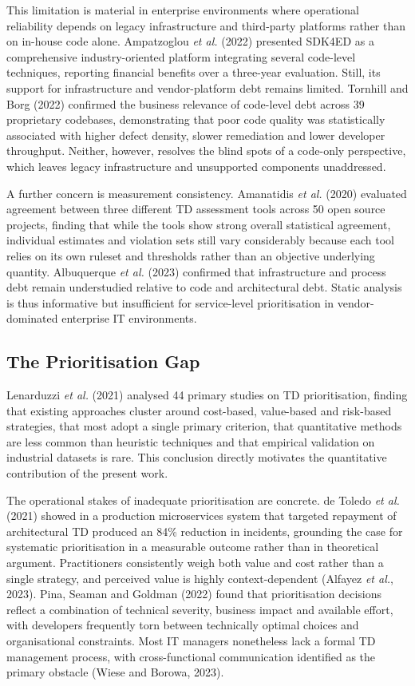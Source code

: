 \documentclass[
  12pt,
  letterpaper,
  12pt,
  oneside,
  english,
  onehalfspacing,
  headsepline]{MastersDoctoralThesis}
\begin{document}
This limitation is material in enterprise environments where operational
reliability depends on legacy infrastructure and third-party platforms
rather than on in-house code alone. Ampatzoglou \emph{et al.} (2022)
presented SDK4ED as a comprehensive industry-oriented platform
integrating several code-level techniques, reporting financial benefits
over a three-year evaluation. Still, its support for infrastructure and
vendor-platform debt remains limited. Tornhill and Borg (2022) confirmed
the business relevance of code-level debt across 39 proprietary
codebases, demonstrating that poor code quality was statistically
associated with higher defect density, slower remediation and lower
developer throughput. Neither, however, resolves the blind spots of a
code-only perspective, which leaves legacy infrastructure and
unsupported components unaddressed.

A further concern is measurement consistency. Amanatidis \emph{et al.}
(2020) evaluated agreement between three different TD assessment tools
across 50 open source projects, finding that while the tools show strong
overall statistical agreement, individual estimates and violation sets
still vary considerably because each tool relies on its own ruleset and
thresholds rather than an objective underlying quantity. Albuquerque
\emph{et al.} (2023) confirmed that infrastructure and process debt
remain understudied relative to code and architectural debt. Static
analysis is thus informative but insufficient for service-level
prioritisation in vendor-dominated enterprise IT environments.

\subsection{The Prioritisation Gap}\label{the-prioritisation-gap}

Lenarduzzi \emph{et al.} (2021) analysed 44 primary studies on TD
prioritisation, finding that existing approaches cluster around
cost-based, value-based and risk-based strategies, that most adopt a
single primary criterion, that quantitative methods are less common than
heuristic techniques and that empirical validation on industrial
datasets is rare. This conclusion directly motivates the quantitative
contribution of the present work.

The operational stakes of inadequate prioritisation are concrete. de
Toledo \emph{et al.} (2021) showed in a production microservices system
that targeted repayment of architectural TD produced an 84\% reduction
in incidents, grounding the case for systematic prioritisation in a
measurable outcome rather than in theoretical argument. Practitioners
consistently weigh both value and cost rather than a single strategy,
and perceived value is highly context-dependent (Alfayez \emph{et al.},
2023). Pina, Seaman and Goldman (2022) found that prioritisation
decisions reflect a combination of technical severity, business impact
and available effort, with developers frequently torn between
technically optimal choices and organisational constraints. Most IT
managers nonetheless lack a formal TD management process, with
cross-functional communication identified as the primary obstacle (Wiese
and Borowa, 2023).
\end{document}
